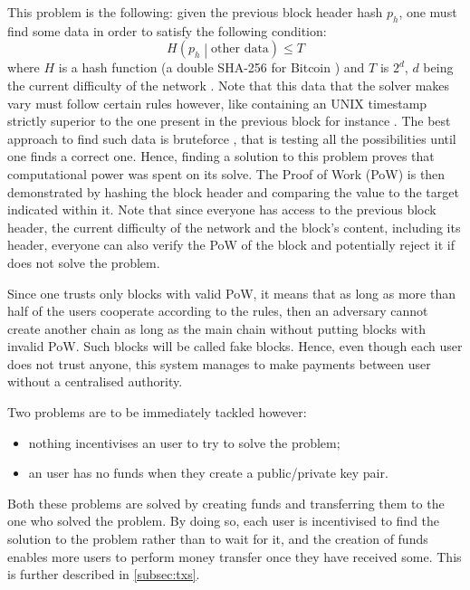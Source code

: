         This problem is the following: given the previous block header hash \(p_h\), one must find some data in order to satisfy the following condition:
        \[H\left(p_h\middle|\text{other data}\right)\leqslant T\]
        where \(H\) is a hash function (a double SHA-256 for Bitcoin \cite{SoK}) and \(T\) is \(2^{d}\), \(d\) being the current difficulty of the network \cite{PoDL}. Note that this data that the solver makes vary must follow certain rules however, like containing an UNIX timestamp strictly superior to the one present in the previous block for instance \cite{BitcoinHeader}. The best approach to find such data is bruteforce \cite{PoDL}, that is testing all the possibilities until one finds a correct one. Hence, finding a solution to this problem proves that computational power was spent on its solve. The Proof of Work (PoW) is then demonstrated by hashing the block header and comparing the value to the target indicated within it. Note that since everyone has access to the previous block header, the current difficulty of the network and the block's content, including its header, everyone can also verify the PoW of the block and potentially reject it if does not solve the problem.
        
        Since one trusts only blocks with valid PoW, it means that as long as more than half of the users cooperate according to the rules, then an adversary cannot create another chain as long as the main chain without putting blocks with invalid PoW. Such blocks will be called fake blocks. Hence, even though each user does not trust anyone, this system manages to make payments between user without a centralised authority.
        
        Two problems are to be immediately tackled however:
        
        \begin{itemize}
            \item nothing incentivises an user to try to solve the problem;
            \item an user has no funds when they create a public/private key pair.
        \end{itemize}
        
        Both these problems are solved by creating funds and transferring them to the one who solved the problem. By doing so, each user is incentivised to find the solution to the problem rather than to wait for it, and the creation of funds enables more users to perform money transfer once they have received some. This is further described in \autoref{subsec:txs}.
        
